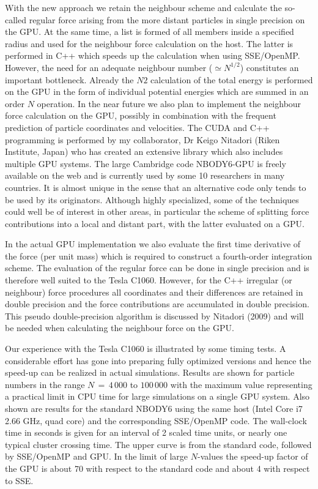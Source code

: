 \documentclass[12pt]{article}
\begin{document}
With the new approach we retain the neighbour scheme and calculate the
so-called regular force arising from the more distant particles in single 
precision on the GPU.
At the same time, a list is formed of all members inside a specified radius
and used for the neighbour force calculation on the host.
The latter is performed in C++ which speeds up the calculation when using
SSE/OpenMP.
However, the need for an adequate neighbour number ($\simeq N^{1/2}$)
constitutes an important bottleneck.
Already the $N2$ calculation of the total energy is performed on the GPU in
the form of individual potential energies which are summed in an order $N$
operation.
In the near future we also plan to implement the neighbour force calculation
on the GPU, possibly in combination with the frequent prediction of particle
coordinates and velocities.
The CUDA and C++ programming is performed by my collaborator, Dr Keigo
Nitadori (Riken Institute, Japan) who has created an extensive library
which also includes multiple GPU systems.
The large Cambridge code NBODY6-GPU is freely available on the web and is
currently used by some 10 researchers in many countries.
It is almost unique in the sense that an alternative code only tends to be
used by its originators.
Although highly specialized, some of the techniques could well be of interest
in other areas, in particular the scheme of splitting force contributions
into a local and distant part, with the latter evaluated on a GPU.

In the actual GPU implementation we also evaluate the first time derivative
of the force (per unit mass) which is required to construct a fourth-order
integration scheme.
The evaluation of the regular force can be done in single precision and is
therefore well suited to the Tesla C1060.
However, for the C++ irregular (or neighbour) force procedures all
coordinates and their differences are retained in double precision and the
force contributions are accumulated in double precision.
This pseudo double-precision algorithm is discussed by Nitadori (2009)
and will be needed when calculating the neighbour force on the GPU.

Our experience with the Tesla C1060 is illustrated by some timing tests.
A considerable effort has gone into preparing fully optimized versions and
hence the speed-up can be realized in actual simulations.
Results are shown for particle numbers in the range $N\,=\,4\,000$ to
$100\,000$ with the maximum value representing a practical limit in CPU
time for large simulations on a single GPU system.
Also shown are results for the standard NBODY6 using the same host (Intel Core
i7 2.66 GHz, quad core) and the corresponding SSE/OpenMP code.
The wall-clock time in seconds is given for an interval of 2 scaled time
units, or nearly one typical cluster crossing time.
The upper curve is from the standard code, followed by SSE/OpenMP and GPU.
In the limit of large $N$-values the speed-up factor of the GPU is about 70
with respect to the standard code and about 4 with respect to SSE.
\end{document}
